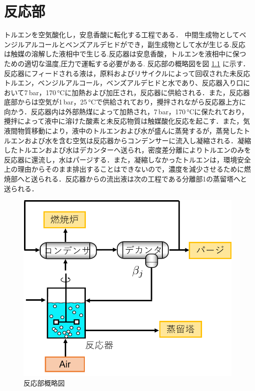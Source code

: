 \documentclass[a4j]{jsreport}
\begin{document}
\clearpage
\chapter{反応部}
トルエンを空気酸化し，安息香酸に転化する工程である．
中間生成物としてベンジルアルコールとベンズアルデヒドができ，副生成物として水が生じる.反応は触媒の溶解した液相中で生じる.反応器は安息香酸，トルエンを液相中に保つための適切な温度,圧力で運転する必要がある.
反応部の概略図を図 \ref{反応部設計結果の概略図} に示す．
反応器にフィードされる液は，原料およびリサイクルによって回収された未反応トルエン，ベンジルアルコール，ベンズアルデヒドと水であり、反応器入り口において7\,\si{\bar}，170\,\si{\degreeCelsius}に加熱および加圧され，反応器に供給される．また，反応器底部からは空気が1\,\si{\bar}，25\,\si{\degreeCelsius}で供給されており，攪拌されながら反応器上方に向かう．反応器内は外部熱煤によって加熱され，7\,\si{\bar}，170\,\si{\degreeCelsius}に保たれており，攪拌によって液中に溶けた酸素と未反応物質は触媒酸化反応を起こす．また，気液間物質移動により，液中のトルエンおよび水が盛んに蒸発するが，蒸発したトルエンおよび水を含む空気は反応器からコンデンサーに流入し凝縮される．凝縮したトルエンおよび水はデカンターへ送られ，密度差分離によりトルエンのみを反応器に還流し，水はパージする．また，凝縮しなかったトルエンは，環境安全上の理由からそのまま排出することはできないので，濃度を減少させるために燃焼部へと送られる．反応器からの流出液は次の工程である分離部1の蒸留塔へと送られる．
\begin{figure}[htbp]
  \centering
  \includegraphics[scale=0.7]{ReactionSection.png}
  \caption{反応部概略図}
  \label{反応部設計結果の概略図}
\end{figure}
\end{document}
